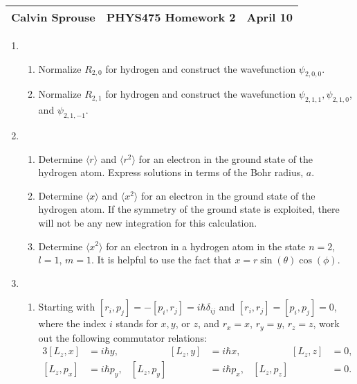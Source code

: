\documentclass[a4paper, 12pt]{config/homework}
\begin{document}
\noindent
\begin{tabularx}{\textwidth}{>{\centering\arraybackslash}X>{\centering\arraybackslash}X>{\centering\arraybackslash}X}
Calvin Sprouse & PHYS475 Homework 2 & 2024 April 10\\
\midrule
\end{tabularx}

\begin{enumerate}
\item \begin{enumerate}[label=(\alph*)]
\item Normalize \(R_{2,0}\) for hydrogen and construct the wavefunction \(\psi_{2,0,0}\). \bigskip



\item Normalize \(R_{2,1}\) for hydrogen and construct the wavefunction \(\psi_{2,1,1}, \psi_{2,1,0}\), and \(\psi_{2,1,-1}\). \bigskip



\end{enumerate}
\pagebreak
\item \begin{enumerate}[label=(\alph*)]
\item Determine \(\langle r \rangle\) and \(\langle r^2 \rangle\) for an electron in the ground state of the hydrogen atom. Express solutions in terms of the Bohr radius, \(a\). \bigskip



\item Determine \(\langle x \rangle\) and \(\langle x^2 \rangle\) for an electron in the ground state of the hydrogen atom. If the symmetry of the ground state is exploited, there will not be any new integration for this calculation. \bigskip



\item Determine \(\langle x^2 \rangle\) for an electron in a hydrogen atom in the state \(n=2\), \(l=1\), \(m=1\). It is helpful to use the fact that \(x=r\sin(\theta)\cos(\phi)\). \bigskip



\end{enumerate}
\pagebreak
\item \begin{enumerate}[label=(\alph*)]
\item Starting with \([r_i,p_j]=-[p_i,r_j]=i\hbar\delta_{ij}\) and \([r_i,r_j]=[p_i,p_j]=0\), where the index \(i\) stands for \(x,y\), or \(z\), and \(r_x=x\), \(r_y=y\), \(r_z=z\), work out the following commutator relations:
\begin{alignat*}{3}
[L_z,x] & =i\hbar y, & \qquad\qquad [L_z,y] & =i\hbar x, & \qquad\qquad [L_z,z] & =0, \\
[L_z,p_x]&=i\hbar p_y, & [L_z, p_y]&=i\hbar p_x, & [L_z, p_z]&=0.
\end{alignat*} \bigskip




\end{enumerate}
\end{enumerate}
\end{document}
